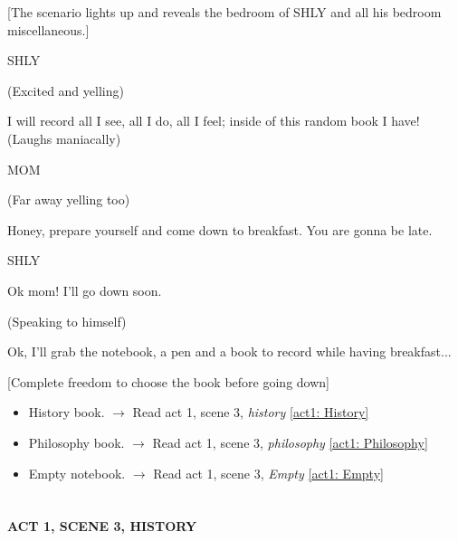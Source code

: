 \vspace{0.5cm}
[The scenario lights up and reveals the bedroom of SHLY and all his bedroom miscellaneous.]
\vspace{0.5cm}

SHLY\par
(Excited and yelling)\par
I will record all I see, all I do, all I feel; inside of this random book I have! (Laughs maniacally)\par

\vspace{1cm}

MOM\par
(Far away yelling too)\par
Honey, prepare yourself and come down to breakfast. You are gonna be late.

\vspace{1cm}

SHLY\par
Ok mom! I'll go down soon. \par

\vspace{0.5cm}
(Speaking to himself)\par
Ok, I'll grab the notebook, a pen and a book to record while having breakfast...

\vspace{0.5cm}
[Complete freedom to choose the book before going down]
\begin{itemize}
    \item History book. $\rightarrow$ Read act 1, scene 3, \textit{history} \ref{act1: History}
    \item Philosophy book. $\rightarrow$ Read act 1, scene 3, \textit{philosophy} \ref{act1: Philosophy}
    \item Empty notebook. $\rightarrow$ Read act 1, scene 3, \textit{Empty} \ref{act1: Empty}
\end{itemize}
\vspace{0.5cm}

\vspace{3cm}

\section*{}
\textbf{ACT 1, SCENE 3, HISTORY}\label{act1: History}\par 
[After grabbing the book and going downstairs, SHLY sits on a chair in front of the table and starts eating.]

